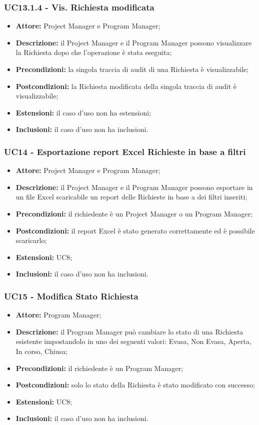 \subsubsection*{UC13.1.4 - Vis. Richiesta modificata}
\begin{itemize}[label=$\circ$]
\item \textbf{Attore:} Project Manager e Program Manager;
\item \textbf{Descrizione:} il Project Manager e il Program Manager possono visualizzare la Richiesta dopo che l'operazione è stata eseguita;
\item \textbf{Precondizioni:} la singola traccia di audit di una Richiesta è visualizzabile;
\item \textbf{Postcondizioni:} la Richiesta modificata della singola traccia di audit è visualizzabile;
\item \textbf{Estensioni:} il caso d'uso non ha estensioni;
\item \textbf{Inclusioni:} il caso d'uso non ha inclusioni.
\end{itemize}

\subsubsection*{UC14 - Esportazione report Excel Richieste in base a filtri}
\begin{itemize}[label=$\circ$]
\item \textbf{Attore:} Project Manager e Program Manager;
\item \textbf{Descrizione:} il Project Manager e il Program Manager possono esportare in un file Excel scaricabile un report delle Richieste in base a dei filtri inseriti;
\item \textbf{Precondizioni:} il richiedente è un Project Manager o un Program Manager;
\item \textbf{Postcondizioni:} il report Excel è stato generato correttamente ed è possibile scaricarlo;
\item \textbf{Estensioni:} UC8;
\item \textbf{Inclusioni:} il caso d'uso non ha inclusioni.
\end{itemize}

\subsubsection*{UC15 - Modifica Stato Richiesta}
\begin{itemize}[label=$\circ$]
\item \textbf{Attore:} Program Manager;
\item \textbf{Descrizione:} il Program Manager può cambiare lo stato di una Richiesta esistente impostandolo in uno dei seguenti valori: Evasa, Non Evasa, Aperta, In corso, Chiusa;
\item \textbf{Precondizioni:} il richiedente è un Program Manager;
\item \textbf{Postcondizioni:} solo lo stato della Richiesta è stato modificato con successo;
\item \textbf{Estensioni:} UC8;
\item \textbf{Inclusioni:} il caso d'uso non ha inclusioni.
\end{itemize}

